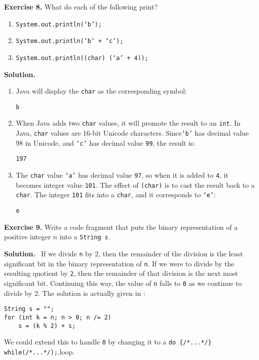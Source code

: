 \documentclass[12pt, a4paper]{article}
\newenvironment{ex}[2][Exercise]
{\par\medskip\noindent \textbf{#1 #2.}}
{\medskip}
\newenvironment{sol}[1][Solution]
{\par\medskip\noindent \textbf{#1.} }
{\medskip}
\begin{document}
	\begin{ex}{8}
		What do each of the following print?
		\begin{enumerate}[label=(\alph*)]
			\item \texttt{System.out.println(`b');}
			\item \texttt{System.out.println(`b' + `c');}
			\item \texttt{System.out.println((char) (`a' + 4));}
		\end{enumerate}
	\end{ex}
	\begin{sol}
		\
		\begin{enumerate}[label=(\alph*)]
			\item Java will display the \texttt{char} as the corresponding symbol:
			\begin{lstlisting}[language={}]
b
			\end{lstlisting}
			\item When Java adds two \texttt{char} values, it will promote the result to
			an \texttt{int}. In Java, \texttt{char} values are 16-bit Unicode characters.
			Since\texttt{`b'} has decimal value 98 in Unicode, and \texttt{`c'} has decimal
			value \texttt{99}, the result is:
			\begin{lstlisting}[language={}]
197
			\end{lstlisting}
			\item The \texttt{char} value \texttt{`a'} has decimal value \texttt{97},
			so when it is added to \texttt{4}, it becomes integer value \texttt{101}.
			The effect of \texttt{(char)} is to cast the result back to a \texttt{char}.
			The integer \texttt{101} fits into a \texttt{char}, and it corresponds to 
			\texttt{`e'}:
			\begin{lstlisting}[language={}]
e
			\end{lstlisting}
		\end{enumerate}
	\end{sol}
	\begin{ex}{9}
		Write a code fragment that puts the binary representation of a  positive integer $n$
		into a \texttt{String s}.
	\end{ex}
	\begin{sol}
		\
		If we divide \texttt{n} by 2, then the remainder of the division is the least significant
		bit in the binary representation of \texttt{n}. If we were to divide by the resulting
		quotient by \texttt{2}, then the remainder of that division is the next most significant bit.
		Continuing this way, the value of \texttt{n} falls to \texttt{0} as we continue to
		divide by 2. The solution is actually given in \cite{sedgewick_wayne}:
		\begin{lstlisting}
String s = "";
for (int k = n; n > 0; n /= 2)
	s = (k % 2) + s;
		\end{lstlisting}
		We could extend this to handle \texttt{0} by changing it to a
		\texttt{do \{/*...*/\} while(/*...*/);}.loop.
	\end{sol}
\end{document}
